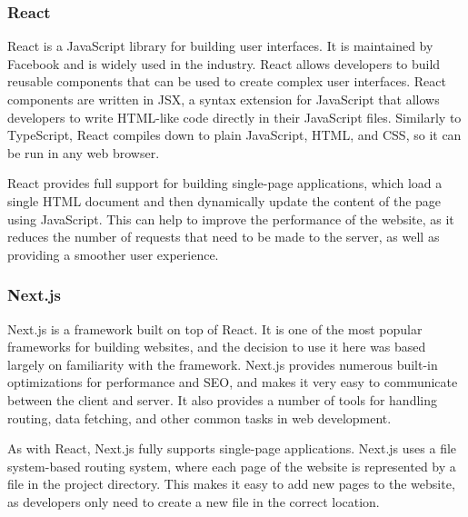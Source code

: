 \documentclass[../main.tex]{subfiles}
\begin{document}
            \subsubsection{React}
                React is a JavaScript library for building user interfaces.
                It is maintained by Facebook and is widely used in the industry.
                React allows developers to build reusable components that can be used to create
                    complex user interfaces.
                React components are written in JSX, a syntax extension for JavaScript that
                    allows developers to write HTML-like code directly in their JavaScript files.
                Similarly to TypeScript, React compiles down to plain JavaScript, HTML, and
                    CSS, so it can be run in any web browser.

                React provides full support for building single-page applications, which load a
                    single HTML document and then dynamically update the content of the page using
                    JavaScript.
                This can help to improve the performance of the website, as it reduces the
                    number of requests that need to be made to the server, as well as providing a
                    smoother user experience.

            \subsubsection{Next.js}
                Next.js is a framework built on top of React.
                It is one of the most popular frameworks for building websites, and the
                    decision to use it here was based largely on familiarity with the framework.
                Next.js provides numerous built-in optimizations for performance and SEO, and
                    makes it very easy to communicate between the client and server.
                It also provides a number of tools for handling routing, data fetching, and
                    other common tasks in web development.

                As with React, Next.js fully supports single-page applications.
                Next.js uses a file system-based routing system, where each page of the website
                    is represented by a file in the project directory.
                This makes it easy to add new pages to the website, as developers only need to
                    create a new file in the correct location.
\end{document}
